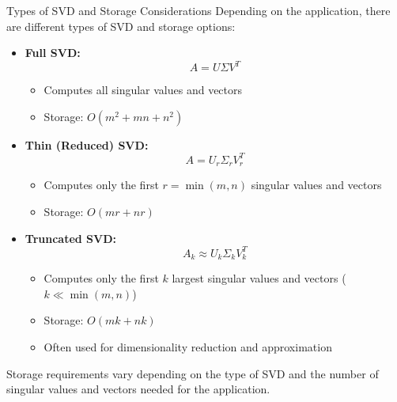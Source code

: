 \documentclass[fullscreen=true, bookmarks=true, hyperref={pdfencoding=unicode}]{beamer}
\begin{document}
\begin{frame}{Types of SVD and Storage Considerations}
  Depending on the application, there are different types of SVD and storage options:

  \begin{itemize}
    \item \textbf{Full SVD:}
      \[
      A = U\Sigma V^T
      \]
      \begin{itemize}
        \item Computes all singular values and vectors
        \item Storage: $O(m^2 + mn + n^2)$
      \end{itemize}

    \pause
    \item \textbf{Thin (Reduced) SVD:}
      \[
      A = U_r\Sigma_r V_r^T
      \]
      \begin{itemize}
        \item Computes only the first $r = \min(m, n)$ singular values and vectors
        \item Storage: $O(mr + nr)$
      \end{itemize}
  \end{itemize}
\end{frame}


\begin{frame}
  \begin{itemize}
    \item \textbf{Truncated SVD:}
    \[
    A_k \approx U_k\Sigma_k V_k^T
    \]
    \begin{itemize}
      \item Computes only the first $k$ largest singular values and vectors ($k \ll \min(m, n)$)
      \item Storage: $O(mk + nk)$
      \item Often used for dimensionality reduction and approximation
    \end{itemize}
  \end{itemize}
  
  Storage requirements vary depending on the type of SVD and the number of singular values and vectors needed for the application.
\end{frame}
\end{document}
